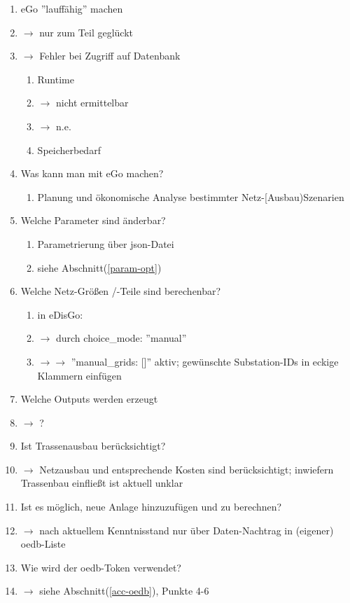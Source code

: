 \documentclass[
a4paper,     %
12pt         %
]{scrartcl}  %
\begin{document}
\begin{enumerate}
	\item eGo ''lauffähig'' machen
	\item[]$\rightarrow$ nur zum Teil geglückt
	\item[]$\rightarrow$ Fehler bei Zugriff auf Datenbank
	\begin{enumerate}
		\item Runtime
		\item[] $\rightarrow$ nicht ermittelbar
		\item[] $\rightarrow$ n.e.
		\item Speicherbedarf
	\end{enumerate} 
	\item Was kann man mit eGo machen?
	\begin{enumerate}
		\item Planung und ökonomische Analyse bestimmter Netz-[Ausbau)Szenarien
		 
	\end{enumerate}
	\item Welche Parameter sind änderbar?
	\begin{enumerate}
		\item Parametrierung über json-Datei
		\item siehe Abschnitt(\ref{param-opt})
	\end{enumerate}
	\item Welche Netz-Größen /-Teile sind berechenbar?
	\begin{enumerate}
		\item in eDisGo:
		\item[] $\rightarrow$ durch choice\_mode: ''manual''
		\item[] $\rightarrow \rightarrow$ ''manual\_grids: []'' aktiv; gewünschte Substation-IDs in eckige Klammern einfügen
	\end{enumerate}
	\item Welche Outputs werden erzeugt
	\item[] $\rightarrow$ ?
	
	\item Ist Trassenausbau berücksichtigt?
	\item[] $\rightarrow$ Netzausbau und entsprechende Kosten sind berücksichtigt; inwiefern Trassenbau einfließt ist aktuell unklar
	
	\item Ist es möglich, neue Anlage hinzuzufügen und zu berechnen?
	\item[] $\rightarrow$ nach aktuellem Kenntnisstand nur über Daten-Nachtrag in (eigener) oedb-Liste 
	\item Wie wird der oedb-Token verwendet?
	\item[] $\rightarrow$ siehe Abschnitt(\ref{acc-oedb}), Punkte 4-6
	

\end{enumerate}
\end{document}
